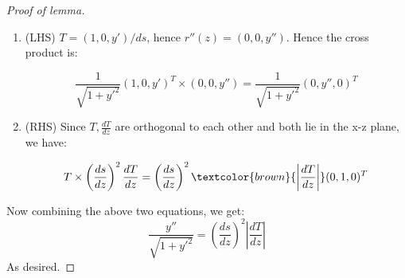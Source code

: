 \begin{framed}
\begin{proof}[Proof of lemma]
\begin{enumerate}
\item (LHS) $T=(1,0,y')/ds$, hence $r''(z) = (0,0,y'')$. Hence the cross product is:

\begin{equation}
\frac{1}{\sqrt{1+y'^2}} (1,0,y')^T \times (0,0,y'')  = \frac{1}{\sqrt{1+y'^2}}(0,y'',0)^T
\end{equation}


\item (RHS) Since $T, \frac{dT}{dz}$ are orthogonal to each other and both lie in the x-z plane, we have:

\begin{equation}
T \times \left(\frac{ds}{dz}\right)^2\frac{dT}{dz} =  \left(\frac{ds}{dz}\right)^2 \textcolor{brown}{\left|\frac{dT}{dz}\right|} (0,1,0)^T
\end{equation}
\end{enumerate}

Now combining the above two equations, we get:
\begin{equation}
\frac{y''}{\sqrt{1+y'^2}}=\left(\frac{ds}{dz}\right)^2  \left|\frac{dT}{dz}\right|
\end{equation}
As desired.

\end{proof}
\end{framed}

